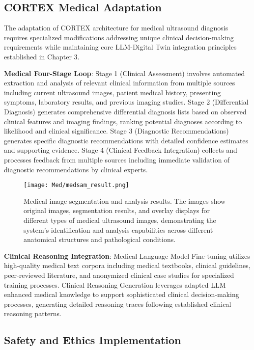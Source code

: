 \subsection{CORTEX Medical Adaptation}

The adaptation of CORTEX architecture for medical ultrasound diagnosis requires specialized modifications addressing unique clinical decision-making requirements while maintaining core LLM-Digital Twin integration principles established in Chapter 3.

\textbf{Medical Four-Stage Loop}: Stage 1 (Clinical Assessment) involves automated extraction and analysis of relevant clinical information from multiple sources including current ultrasound images, patient medical history, presenting symptoms, laboratory results, and previous imaging studies. Stage 2 (Differential Diagnosis) generates comprehensive differential diagnosis lists based on observed clinical features and imaging findings, ranking potential diagnoses according to likelihood and clinical significance. Stage 3 (Diagnostic Recommendations) generates specific diagnostic recommendations with detailed confidence estimates and supporting evidence. Stage 4 (Clinical Feedback Integration) collects and processes feedback from multiple sources including immediate validation of diagnostic recommendations by clinical experts.

\begin{figure}[htbp]
\centering
\texttt{[image: Med/medsam\_result.png]}
\caption{Medical image segmentation and analysis results. The images show
original images, segmentation results, and overlay displays for different types of
medical ultrasound images, demonstrating the system's identification and analysis
capabilities across different anatomical structures and pathological conditions.}
\label{fig:medsam_result}
\end{figure}

\textbf{Clinical Reasoning Integration}: Medical Language Model Fine-tuning utilizes high-quality medical text corpora including medical textbooks, clinical guidelines, peer-reviewed literature, and anonymized clinical case studies for specialized training processes. Clinical Reasoning Generation leverages adapted LLM enhanced medical knowledge to support sophisticated clinical decision-making processes, generating detailed reasoning traces following established clinical reasoning patterns.

\subsection{Safety and Ethics Implementation}

